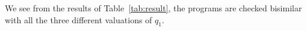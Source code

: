 \documentclass[a4paper,UKenglish,cleveref, autoref]{lipics-v2019}
\begin{document}
We see from the results of Table~\ref{tab:result}, the programs are checked bisimilar with all the three different valuations of $q_1$.
\end{document}
